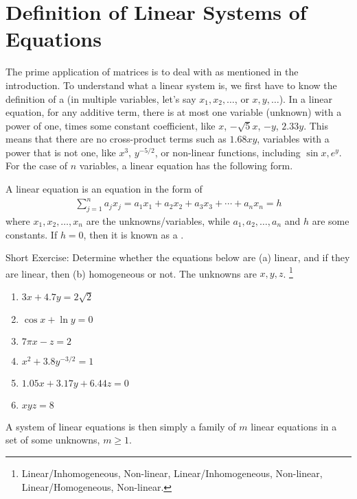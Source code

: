 \section{Definition of Linear Systems of Equations}
\label{section:deflinsys}
The prime application of matrices is to deal with  as mentioned in the introduction. To understand what a linear system is, we first have to know the definition of a  (in multiple variables, let's say $x_1, x_2, \ldots$, or $x, y, \ldots$). In a linear equation, for any additive term, there is at most one variable (unknown) with a power of one, times some constant coefficient, like $x$, $-\sqrt{5}x$, $-y$, $2.33y$. This means that there are no cross-product terms such as $1.68xy$, variables with a power that is not one, like $x^3$, $y^{-5/2}$, or non-linear functions, including $\sin{x}, e^{y}$. For the case of $n$ variables, a linear equation has the following form.
\begin{defn}
A linear equation is an equation in the form of
\begin{align}
\sum_{j=1}^n a_jx_j = a_1x_1 + a_2x_2 + a_3x_3 + \cdots + a_nx_n = h
\end{align}
where $x_1, x_2, \ldots, x_n$ are the unknowns/variables, while $a_1, a_2, \ldots, a_n$ and $h$ are some constants. If $h = 0$, then it is known as a .
\end{defn}
Short Exercise: Determine whether the equations below are (a) linear, and if they are linear, then (b) homogeneous or not. The unknowns are $x, y, z$. \footnote{Linear/Inhomogeneous, Non-linear, Linear/Inhomogeneous, Non-linear, Linear/Homogeneous, Non-linear.}
\begin{enumerate}
    \item $3x + 4.7y = 2\sqrt{2}$ 
    \item $\cos x + \ln y = 0$
    \item $7\pi x - z = 2$ 
    \item $x^2 + 3.8y^{-3/2} = 1$
    \item $1.05x + 3.17y + 6.44z = 0$
    \item $xyz = 8$ 
\end{enumerate}
A system of linear equations is then simply a family of $m$ linear equations in a set of some unknowns, $m \geq 1$.
